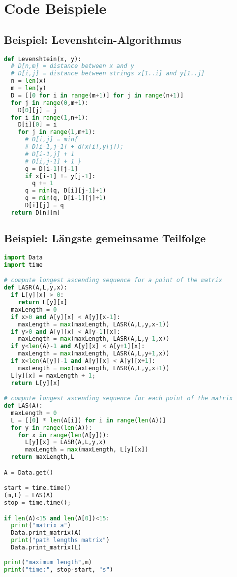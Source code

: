 \section{Code Beispiele}

\begin{sectionbox}
\subsection{Beispiel: Levenshtein-Algorithmus}
\begin{lstlisting}[language=Python]
def Levenshtein(x, y):
  # D[n,m] = distance between x and y
  # D[i,j] = distance between strings x[1..i] and y[1..j]
  n = len(x)
  m = len(y)
  D = [[0 for i in range(m+1)] for j in range(n+1)]
  for j in range(0,m+1):
    D[0][j] = j
  for i in range(1,n+1):
    D[i][0] = i
    for j in range(1,m+1):
      # D[i,j] = min{ 
      # D[i-1,j-1] + d(x[i],y[j]);
      # D[i-1,j] + 1
      # D[i,j-1] + 1 }
      q = D[i-1][j-1] 
      if x[i-1] != y[j-1]:
        q += 1
      q = min(q, D[i][j-1]+1)
      q = min(q, D[i-1][j]+1)
      D[i][j] = q
  return D[n][m]
\end{lstlisting}
\end{sectionbox}

\begin{sectionbox}
\subsection{Beispiel: Längste gemeinsame Teilfolge}
\begin{lstlisting}[language=Python]
import Data
import time

# compute longest ascending sequence for a point of the matrix
def LASR(A,L,y,x):
  if L[y][x] > 0:
    return L[y][x]
  maxLength = 0
  if x>0 and A[y][x] < A[y][x-1]: 
    maxLength = max(maxLength, LASR(A,L,y,x-1))
  if y>0 and A[y][x] < A[y-1][x]: 
    maxLength = max(maxLength, LASR(A,L,y-1,x))
  if y<len(A)-1 and A[y][x] < A[y+1][x]: 
    maxLength = max(maxLength, LASR(A,L,y+1,x))
  if x<len(A[y])-1 and A[y][x] < A[y][x+1]: 
    maxLength = max(maxLength, LASR(A,L,y,x+1))
  L[y][x] = maxLength + 1;
  return L[y][x]

# compute longest ascending sequence for each point of the matrix
def LAS(A):
  maxLength = 0
  L = [[0] * len(A[i]) for i in range(len(A))]
  for y in range(len(A)):
    for x in range(len(A[y])):
      L[y][x] = LASR(A,L,y,x)
      maxLength = max(maxLength, L[y][x])
  return maxLength,L

A = Data.get()

start = time.time()
(m,L) = LAS(A)
stop = time.time();

if len(A)<15 and len(A[0])<15:
  print("matrix a")
  Data.print_matrix(A)
  print("path lengths matrix")
  Data.print_matrix(L)
  
print("maximum length",m)
print("time:", stop-start, "s")
\end{lstlisting}\vspace{-6px}
\end{sectionbox}

